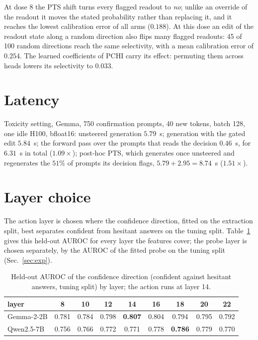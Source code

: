 \documentclass{article}
\begin{document}
At dose 8 the PTS shift turns every flagged readout to \emph{no}; unlike an
override of the readout it moves the stated probability rather than replacing
it, and it reaches the lowest calibration error of all arms ($0.188$). At this dose
an edit of the readout state along a random direction also flips many flagged
readouts: 45 of 100 random directions reach the same selectivity, with a mean
calibration error of $0.254$. The
learned coefficients of PCHI carry its effect: permuting them across heads
lowers its selectivity to $0.033$.

\section{Latency}
\label{app:latency}

Toxicity setting, Gemma, 750 confirmation prompts, 40 new tokens, batch 128,
one idle H100, bfloat16: unsteered generation $5.79$~s; generation with the
gated edit $5.84$~s; the forward pass over the prompts that reads the decision
$0.46$~s, for $6.31$~s in total ($1.09\times$); post-hoc PTS, which generates
once unsteered and regenerates the $51\%$ of prompts its decision flags,
$5.79+2.95=8.74$~s ($1.51\times$).

\section{Layer choice}
\label{app:layers}

The action layer is chosen where the confidence direction, fitted on the
extraction split, best separates confident from hesitant answers on the tuning
split. Table~\ref{tab:layerchoice} gives this held-out AUROC for every layer
the features cover; the probe layer is chosen separately, by the AUROC of the
fitted probe on the tuning split (Sec.~\ref{sec:exp}).

\begin{table}[h]\footnotesize\setlength{\tabcolsep}{5pt}
\centering
\begin{tabular}{l|cccccccc}
\hline
layer & 8 & 10 & 12 & 14 & 16 & 18 & 20 & 22 \\
\hline
Gemma-2-2B & 0.781 & 0.784 & 0.798 & \textbf{0.807} & 0.804 & 0.794 & 0.795 & 0.792 \\
Qwen2.5-7B & 0.756 & 0.766 & 0.772 & 0.771 & 0.778 & \textbf{0.786} & 0.779 & 0.770 \\
\hline
\end{tabular}
\caption{Held-out AUROC of the confidence direction (confident against hesitant
answers, tuning split) by layer; the action runs at layer 14.}
\label{tab:layerchoice}
\end{table}
\end{document}
